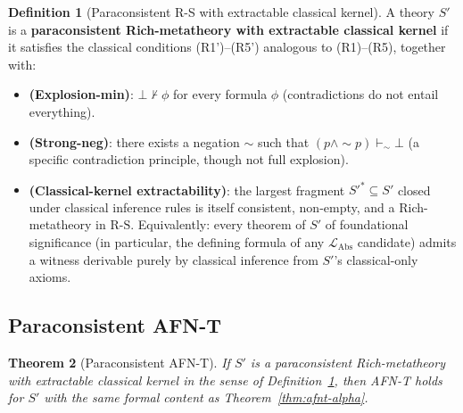 \documentclass[11pt]{article}
\theoremstyle{plain}
\newtheorem{theorem}{Theorem}[section]
\theoremstyle{definition}
\newtheorem{definition}[theorem]{Definition}
\newcommand{\RS}{\mathrm{R\text{-}S}}
\newcommand{\LAbs}{\mathcal{L}_{\mathrm{Abs}}}
\begin{document}
\begin{definition}[Paraconsistent R-S with extractable classical kernel]\label{def:paraconsistent-rs}
A theory $S'$ is a \textbf{paraconsistent Rich-metatheory with extractable classical kernel} if it satisfies the classical conditions (R1')--(R5') analogous to (R1)--(R5), together with:
\begin{itemize}
\item \textbf{(Explosion-min)}: $\bot \not\vdash \phi$ for every formula $\phi$ (contradictions do not entail everything).
\item \textbf{(Strong-neg)}: there exists a negation $\sim$ such that $(p \wedge \sim p) \vdash_\sim \bot$ (a specific contradiction principle, though not full explosion).
\item \textbf{(Classical-kernel extractability)}: the largest fragment $S'^* \subseteq S'$ closed under classical inference rules is itself consistent, non-empty, and a Rich-metatheory in $\RS$. Equivalently: every theorem of $S'$ of foundational significance (in particular, the defining formula of any $\LAbs$ candidate) admits a witness derivable purely by classical inference from $S'$'s classical-only axioms.
\end{itemize}
\end{definition}

\subsection{Paraconsistent AFN-T}

\begin{theorem}[Paraconsistent AFN-T]\label{thm:paraconsistent-afnt}
If $S'$ is a paraconsistent Rich-metatheory with extractable classical kernel in the sense of Definition~\ref{def:paraconsistent-rs}, then AFN-T holds for $S'$ with the same formal content as Theorem~\ref{thm:afnt-alpha}.
\end{theorem}
\end{document}
